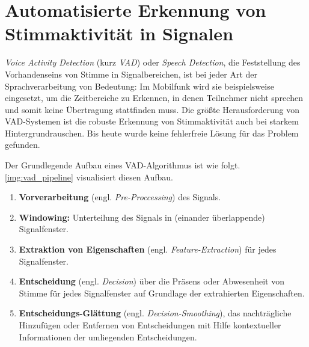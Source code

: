 \section{Automatisierte Erkennung von Stimmaktivität in Signalen}
\label{sec:vad_new}

\emph{Voice Activity Detection} (kurz \emph{VAD}) oder \emph{Speech Detection}, die Feststellung des Vorhandenseins von Stimme in Signalbereichen, ist bei jeder Art der Sprachverarbeitung von Bedeutung: Im Mobilfunk wird sie beispielsweise eingesetzt, um die Zeitbereiche zu Erkennen, in denen Teilnehmer nicht sprechen und somit keine Übertragung stattfinden muss. Die größte Herausforderung von VAD-Systemen ist die robuste Erkennung von Stimmaktivität auch bei starkem Hintergrundrauschen. Bis heute wurde keine fehlerfreie Lösung für das Problem gefunden. \cite[S. 1]{vad_granada} \cite[S. 1]{vad_kola} \cite[S. 1]{vad_Lisboa}

Der Grundlegende Aufbau eines VAD-Algorithmus ist wie folgt. \autoref{img:vad_pipeline} visualisiert diesen Aufbau.
\begin{enumerate}
	\item \textbf{Vorverarbeitung} (engl. \emph{Pre-Proccessing}) des Signals.
	\item \textbf{Windowing: } Unterteilung des Signals in (einander überlappende) Signalfenster.
	\item \textbf{Extraktion von Eigenschaften} (engl. \emph{Feature-Extraction}) für jedes Signalfenster.
	\item \textbf{Entscheidung} (engl. \emph{Decision}) über die Präsens oder Abwesenheit von Stimme für jedes Signalfenster auf Grundlage der extrahierten Eigenschaften.
	\item \textbf{Entscheidungs-Glättung} (engl. \emph{Decision-Smoothing}), das nachträgliche Hinzufügen oder Entfernen von Entscheidungen mit Hilfe kontextueller Informationen der umliegenden Entscheidungen.\cite[S. 8 - 9]{vad_granada} \cite[S. 1 - 2]{vad_kola}
\end{enumerate}

